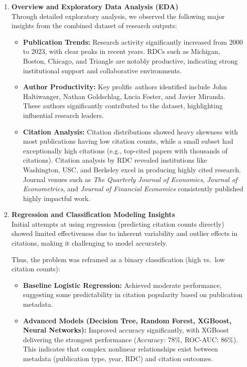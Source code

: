 \documentclass[12pt]{article}
\begin{document}
\begin{enumerate}
  \item \textbf{Overview and Exploratory Data Analysis (EDA)}\\
    Through detailed exploratory analysis, we observed the following major insights from the combined dataset of research outputs:
    \begin{itemize}
      \item \textbf{Publication Trends:}  
        Research activity significantly increased from 2000 to 2023, with clear peaks in recent years. RDCs such as Michigan, Boston, Chicago, and Triangle are notably productive, indicating strong institutional support and collaborative environments.
      \item \textbf{Author Productivity:}  
        Key prolific authors identified include John Haltiwanger, Nathan Goldschlag, Lucia Foster, and Javier Miranda. These authors significantly contributed to the dataset, highlighting influential research leaders.
      \item \textbf{Citation Analysis:}  
        Citation distributions showed heavy skewness with most publications having low citation counts, while a small subset had exceptionally high citations (e.g., top-cited papers with thousands of citations). Citation analysis by RDC revealed institutions like Washington, USC, and Berkeley excel in producing highly cited research. Journal venues such as \textit{The Quarterly Journal of Economics}, \textit{Journal of Econometrics}, and \textit{Journal of Financial Economics} consistently published highly impactful work.
    \end{itemize}

  \item \textbf{Regression and Classification Modeling Insights}\\
    Initial attempts at using regression (predicting citation counts directly) showed limited effectiveness due to inherent variability and outlier effects in citations, making it challenging to model accurately.

    Thus, the problem was reframed as a binary classification (high vs.\ low citation counts):
    \begin{itemize}
      \item \textbf{Baseline Logistic Regression:} Achieved moderate performance, suggesting some predictability in citation popularity based on publication metadata.
      \item \textbf{Advanced Models (Decision Tree, Random Forest, XGBoost, Neural Networks):} Improved accuracy significantly, with XGBoost delivering the strongest performance (Accuracy: 78\%, ROC-AUC: 86\%). This indicates that complex nonlinear relationships exist between metadata (publication type, year, RDC) and citation outcomes.
    \end{itemize}


\end{enumerate}
\end{document}
